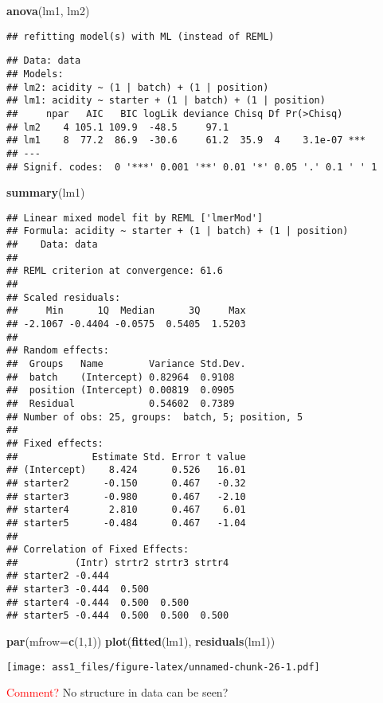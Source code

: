 \documentclass[
]{article}
\newenvironment{Shaded}{\begin{snugshade}}{\end{snugshade}}
\newcommand{\AttributeTok}[1]{\textcolor[rgb]{0.13,0.29,0.53}{#1}}
\newcommand{\DecValTok}[1]{\textcolor[rgb]{0.00,0.00,0.81}{#1}}
\newcommand{\FunctionTok}[1]{\textcolor[rgb]{0.13,0.29,0.53}{\textbf{#1}}}
\newcommand{\NormalTok}[1]{#1}
\begin{document}
\begin{Shaded}
\begin{Highlighting}[]
\FunctionTok{anova}\NormalTok{(lm1, lm2)}
\end{Highlighting}
\end{Shaded}

\begin{verbatim}
## refitting model(s) with ML (instead of REML)
\end{verbatim}

\begin{verbatim}
## Data: data
## Models:
## lm2: acidity ~ (1 | batch) + (1 | position)
## lm1: acidity ~ starter + (1 | batch) + (1 | position)
##     npar   AIC   BIC logLik deviance Chisq Df Pr(>Chisq)    
## lm2    4 105.1 109.9  -48.5     97.1                        
## lm1    8  77.2  86.9  -30.6     61.2  35.9  4    3.1e-07 ***
## ---
## Signif. codes:  0 '***' 0.001 '**' 0.01 '*' 0.05 '.' 0.1 ' ' 1
\end{verbatim}

\begin{Shaded}
\begin{Highlighting}[]
\FunctionTok{summary}\NormalTok{(lm1)}
\end{Highlighting}
\end{Shaded}

\begin{verbatim}
## Linear mixed model fit by REML ['lmerMod']
## Formula: acidity ~ starter + (1 | batch) + (1 | position)
##    Data: data
## 
## REML criterion at convergence: 61.6
## 
## Scaled residuals: 
##     Min      1Q  Median      3Q     Max 
## -2.1067 -0.4404 -0.0575  0.5405  1.5203 
## 
## Random effects:
##  Groups   Name        Variance Std.Dev.
##  batch    (Intercept) 0.82964  0.9108  
##  position (Intercept) 0.00819  0.0905  
##  Residual             0.54602  0.7389  
## Number of obs: 25, groups:  batch, 5; position, 5
## 
## Fixed effects:
##             Estimate Std. Error t value
## (Intercept)    8.424      0.526   16.01
## starter2      -0.150      0.467   -0.32
## starter3      -0.980      0.467   -2.10
## starter4       2.810      0.467    6.01
## starter5      -0.484      0.467   -1.04
## 
## Correlation of Fixed Effects:
##          (Intr) strtr2 strtr3 strtr4
## starter2 -0.444                     
## starter3 -0.444  0.500              
## starter4 -0.444  0.500  0.500       
## starter5 -0.444  0.500  0.500  0.500
\end{verbatim}

\begin{Shaded}
\begin{Highlighting}[]
\FunctionTok{par}\NormalTok{(}\AttributeTok{mfrow=}\FunctionTok{c}\NormalTok{(}\DecValTok{1}\NormalTok{,}\DecValTok{1}\NormalTok{))}
\FunctionTok{plot}\NormalTok{(}\FunctionTok{fitted}\NormalTok{(lm1), }\FunctionTok{residuals}\NormalTok{(lm1))}
\end{Highlighting}
\end{Shaded}

\texttt{[image: ass1\_files/figure-latex/unnamed-chunk-26-1.pdf]}

\textcolor{red}{Comment?} No structure in data can be seen?
\end{document}
